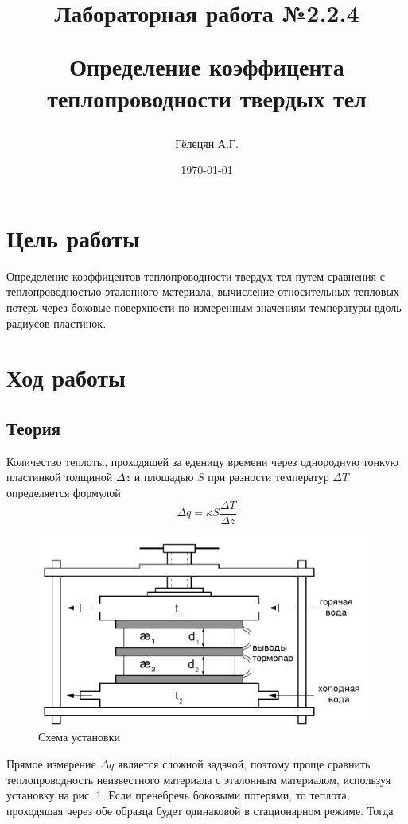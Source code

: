 \documentclass[a4paper, 12pt]{article}
\title{\begin{center}Лабораторная работа №2.2.4\end{center}
Определение коэффицента теплопроводности твердых тел}
\author{Гёлецян А.Г.}
\date{\today}
\begin{document}
    \maketitle
    \newpage

    \section{Цель работы}
    Определение коэффицентов теплопроводности твердух тел путем сравнения с теплопроводностью эталонного материала, вычисление относительных тепловых потерь через боковые поверхности по измеренным значениям температуры вдоль радиусов пластинок.

    \section{Ход работы}
    \subsection{Теория}
    Количество теплоты, проходящей за еденицу времени через однородную тонкую пластинкой толщиной $\Delta z$ и площадью $S$ при разности температур $\Delta T$ определяется формулой
    \[\Delta q = \kappa S \frac{\Delta T}{\Delta z}\]

    \begin{figure}[h]
        \begin{center}
            \includegraphics[width=0.8\linewidth]{ustanovka}
            \caption{Схема установки}
        \end{center}
    \end{figure}

    Прямое измерение $\Delta q$ является сложной задачой, поэтому проще сравнить теплопроводность неизвестного материала с эталонным материалом, используя установку на рис. 1. Если пренебречь боковыми потерями, то теплота, проходящая через обе образца будет одинаковой в стационарном режиме. Тогда
\end{document}
